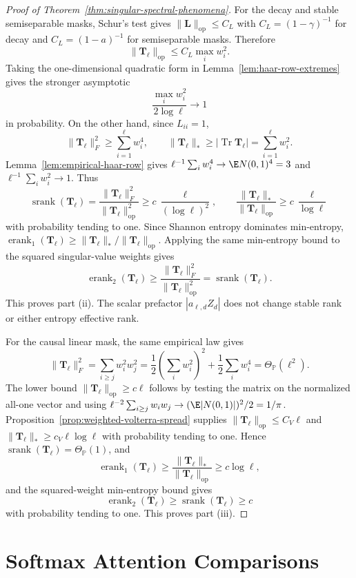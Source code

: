 \documentclass{article}
\newcommand{\Prob}{\mathbb{P}}
\newcommand{\srank}{\operatorname{srank}}
\newcommand{\erank}{\operatorname{erank}}
\newcommand{\op}{\operatorname{op}}
\newcommand{\bL}{\mathbf{L}}
\newcommand{\bT}{\mathbf{T}}
\theoremstyle{definition}
\theoremstyle{remark}
\begin{document}
\begin{proof}[Proof of Theorem~\ref{thm:singular-spectral-phenomena}]
For the decay and stable semiseparable masks, Schur's test gives
$\|\bL\|_{\op}\leq C_L$ with $C_L=(1-\gamma)^{-1}$ for decay and
$C_L=(1-a)^{-1}$ for semiseparable masks.  Therefore
\[
    \|\bT_\ell\|_{\op}
    \leq
    C_L\max_i w_i^2.
\]
Taking the one-dimensional quadratic form in
Lemma~\ref{lem:haar-row-extremes} gives the stronger asymptotic
\[
    \frac{\max_iw_i^2}{2\log\ell}\longrightarrow1
\]
in probability.  On the other hand, since $L_{ii}=1$,
\[
    \|\bT_\ell\|_F^2
    \geq
    \sum_{i=1}^{\ell}w_i^4,
    \qquad
    \|\bT_\ell\|_*
    \geq
    |\operatorname{Tr}\bT_\ell|
    =
    \sum_{i=1}^{\ell}w_i^2.
\]
Lemma~\ref{lem:empirical-haar-row} gives
$\ell^{-1}\sum_iw_i^4\to\E N(0,1)^4=3$ and
$\ell^{-1}\sum_iw_i^2\to1$.  Thus
\[
    \srank(\bT_\ell)
    =
    \frac{\|\bT_\ell\|_F^2}{\|\bT_\ell\|_{\op}^2}
    \geq
    c\,\frac{\ell}{(\log\ell)^2},
    \qquad
    \frac{\|\bT_\ell\|_*}{\|\bT_\ell\|_{\op}}
    \geq
    c\,\frac{\ell}{\log\ell}
\]
with probability tending to one.  Since Shannon entropy dominates min-entropy,
$\erank_{1}(\bT_\ell)\geq
\|\bT_\ell\|_*/\|\bT_\ell\|_{\op}$.  Applying the same min-entropy bound to the
squared singular-value weights gives
\[
    \erank_{2}(\bT_\ell)
    \geq
    \frac{\|\bT_\ell\|_F^2}{\|\bT_\ell\|_{\op}^2}
    =
    \srank(\bT_\ell).
\]
This proves part (ii).  The scalar prefactor
$|a_{\ell,d}Z_d|$ does not change stable rank or either entropy effective rank.

For the causal linear mask, the same empirical law gives
\[
    \|\bT_\ell\|_F^2
    =
    \sum_{i\geq j}w_i^2w_j^2
    =
    \frac12\left(\sum_iw_i^2\right)^2
    +
    \frac12\sum_iw_i^4
    =
    \Theta_{\Prob}(\ell^2).
\]
The lower bound $\|\bT_\ell\|_{\op}\geq c\ell$ follows by testing the matrix on
the normalized all-one vector and using
$\ell^{-2}\sum_{i\geq j}w_iw_j\to(\E|N(0,1)|)^2/2=1/\pi$.
Proposition~\ref{prop:weighted-volterra-spread} supplies
$\|\bT_\ell\|_{\op}\leq C_V\ell$ and
$\|\bT_\ell\|_*\geq c_V\ell\log\ell$ with probability tending to one.  Hence
$\srank(\bT_\ell)=\Theta_{\Prob}(1)$, and
\[
    \erank_{1}(\bT_\ell)
    \geq
    \frac{\|\bT_\ell\|_*}{\|\bT_\ell\|_{\op}}
    \geq
    c\log\ell,
\]
and the squared-weight min-entropy bound gives
\[
    \erank_{2}(\bT_\ell)
    \geq
    \srank(\bT_\ell)
    \geq c
\]
with probability tending to one.  This proves part (iii).
\end{proof}


\section{Softmax Attention Comparisons}
\label{app:softmax-comparisons}
\end{document}
